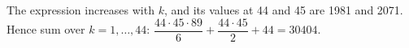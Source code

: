The expression increases with $k$, and its values at 44 and 45 are 1981 and 2071. Hence sum over $k=1,\ldots,44$: $\dfrac{44\cdot45\cdot89}{6}+\dfrac{44\cdot45}{2}+44=\boxed{30404}$.
